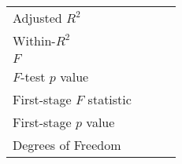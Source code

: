 \begin{tabular}{lrrr}
Adjusted $R^2$            &          &                      &                            \\ 
Within-$R^2$              &          &                      &                            \\ 
$F$                       &          &                      &                            \\ 
$F$-test $p$ value        &          &                      &                            \\ 
First-stage $F$ statistic &          &                      &                            \\ 
First-stage $p$ value     &          &                      &                            \\ 
Degrees of Freedom        &          &                      &                            \\ 
\bottomrule
\end{tabular}
